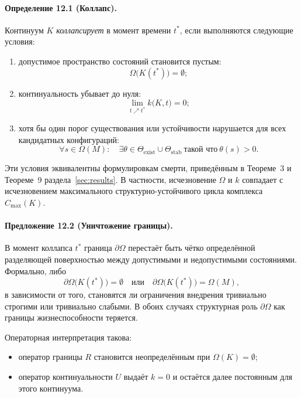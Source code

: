 \paragraph{Определение 12.1 (Коллапс).}
Континуум \(K\) \emph{коллапсирует} в момент времени \(t^{\ast}\), если
выполняются следующие условия:
\begin{enumerate}
  \item допустимое пространство состояний становится пустым:
        \[
          \Omega\big(K(t^{\ast})\big) = \emptyset;
        \]
  \item континуальность убывает до нуля:
        \[
          \lim_{t \nearrow t^{\ast}} k\big(K,t\big) = 0;
        \]
  \item хотя бы один порог существования или устойчивости нарушается для всех
        кандидатных конфигураций:
        \[
          \forall s \in \Omega(M):
          \quad
          \exists \theta \in \Theta_{\mathrm{exist}} \cup \Theta_{\mathrm{stab}}
          \ \text{такой что}\ \theta(s) > 0.
        \]
\end{enumerate}

Эти условия эквивалентны формулировкам смерти, приведённым в
Теореме~3 и Теореме~9 раздела~\ref{sec:results}. В частности, исчезновение
\(\Omega\) и \(k\) совпадает с исчезновением максимального структурно-устойчивого
цикла комплекса \(C_{\max}(K)\).

\paragraph{Предложение 12.2 (Уничтожение границы).}
В момент коллапса \(t^{\ast}\) граница \(\partial\Omega\) перестаёт быть
чётко определённой разделяющей поверхностью между допустимыми и
недопустимыми состояниями. Формально, либо
\begin{equation}
  \partial\Omega\big(K(t^{\ast})\big) = \emptyset
  \quad\text{или}\quad
  \partial\Omega\big(K(t^{\ast})\big) = \Omega(M),
\end{equation}
в зависимости от того, становятся ли ограничения внедрения тривиально строгими
или тривиально слабыми. В обоих случаях структурная роль
\(\partial\Omega\) как границы жизнеспособности теряется.

Операторная интерпретация такова:
\begin{itemize}
  \item оператор границы \(R\) становится неопределённым при
        \(\Omega(K)=\emptyset\);
  \item оператор континуальности \(U\) выдаёт \(k=0\) и остаётся далее
        постоянным для этого континуума.
\end{itemize}

